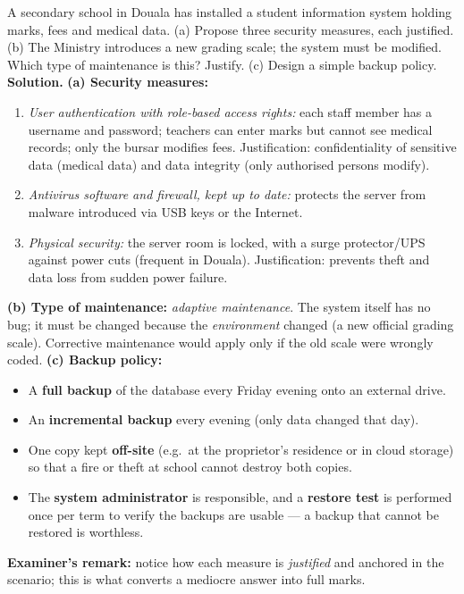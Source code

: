 \documentclass[11pt]{article}
\begin{document}
\begin{exoresolu}
A secondary school in Douala has installed a student information system holding marks, fees and medical data. (a) Propose three security measures, each justified. (b) The Ministry introduces a new grading scale; the system must be modified. Which type of maintenance is this? Justify. (c) Design a simple backup policy.
\tcblower
\textbf{Solution.}
\textbf{(a) Security measures:}
\begin{enumerate}
\item \emph{User authentication with role-based access rights:} each staff member has a username and password; teachers can enter marks but cannot see medical records; only the bursar modifies fees. Justification: confidentiality of sensitive data (medical data) and data integrity (only authorised persons modify).
\item \emph{Antivirus software and firewall, kept up to date:} protects the server from malware introduced via USB keys or the Internet.
\item \emph{Physical security:} the server room is locked, with a surge protector/UPS against power cuts (frequent in Douala). Justification: prevents theft and data loss from sudden power failure.
\end{enumerate}
\textbf{(b) Type of maintenance:} \emph{adaptive maintenance}. The system itself has no bug; it must be changed because the \emph{environment} changed (a new official grading scale). Corrective maintenance would apply only if the old scale were wrongly coded.
\textbf{(c) Backup policy:}
\begin{itemize}
\item A \textbf{full backup} of the database every Friday evening onto an external drive.
\item An \textbf{incremental backup} every evening (only data changed that day).
\item One copy kept \textbf{off-site} (e.g.\ at the proprietor's residence or in cloud storage) so that a fire or theft at school cannot destroy both copies.
\item The \textbf{system administrator} is responsible, and a \textbf{restore test} is performed once per term to verify the backups are usable — a backup that cannot be restored is worthless.
\end{itemize}
\textbf{Examiner's remark:} notice how each measure is \emph{justified} and anchored in the scenario; this is what converts a mediocre answer into full marks.
\end{exoresolu}
\end{document}
